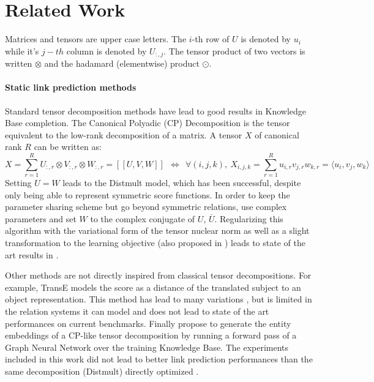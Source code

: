 \documentclass{article}
\newcommand{\brck}[1]{[\![#1]\!]}
\begin{document}
\section{Related Work}
Matrices and tensors are upper case letters. The $i$-th row of $U$ is denoted by $u_i$ while it's $j-th$ column is denoted by $U_{:, j}$. The tensor product of two vectors is written $\otimes$ and the hadamard (elementwise) product $\odot$.

\paragraph{Static link prediction methods}
Standard tensor decomposition methods have lead to good results \citep{yang_embedding_2014, trouillon_complex_2016, lacroix2018canonical, balavzevic2019tucker} in Knowledge Base completion. The Canonical Polyadic (CP) Decomposition \citep{hitchcock_expression_1927} is the tensor equivalent to the low-rank decomposition of a matrix. A tensor $X$ of canonical rank $R$ can be written as:
\begin{equation}
    X = \sum_{r=1}^R U_{:,r} \otimes V_{:,r} \otimes W_{:,r} = \brck{U,V,W} ~~\iff ~~\forall (i,j,k), ~ X_{i,j,k} = \sum_{r=1}^R u_{i,r}v_{j,r}w_{k,r} = \langle u_i, v_j, w_k \rangle
    \label{eq:CP}
\end{equation}
Setting $U=W$ leads to the Distmult \citep{yang_embedding_2014} model, which has been successful, despite only being able to represent symmetric score functions. In order to keep the parameter sharing scheme but go beyond symmetric relations, \citet{trouillon_complex_2016} use complex parameters and set $W$ to the complex conjugate of $U$, $\overline{U}$. Regularizing this algorithm with the variational form of the tensor nuclear norm as well as a slight transformation to the learning objective (also proposed in \citet{kazemi2018simple}) leads to state of the art results in \citet{lacroix2018canonical}. 



Other methods are not directly inspired from classical tensor decompositions. For example, TransE \citep{bordes_translating_2013} models the score as a distance of the translated subject to an object representation. This method has lead to many variations \citep{ji2015knowledge, nguyen2016stranse, wang2014knowledge}, but is limited in the relation systems it can model \citep{kazemi2018simple} and does not lead to state of the art performances on current benchmarks. Finally \citet{schlichtkrull2018modeling} propose to generate the entity embeddings of a CP-like tensor decomposition by running a forward pass of a Graph Neural Network over the training Knowledge Base. The experiments included in this work did not lead to better link prediction performances than the same decomposition (Distmult) directly optimized \citep{kadlec_knowledge_2017}.
\end{document}
